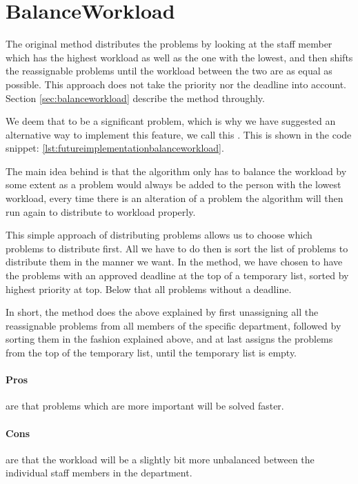 \section{BalanceWorkload}
\label{sec:futureimplementationbalanceworkload}

The original  method distributes the problems by looking at the staff member which has the highest workload as well as the one with the lowest, and then shifts the reassignable problems until the workload between the two are as equal as possible. This approach does not take the priority nor the deadline into account. Section \ref{sec:balanceworkload} describe the  method throughly. 

We deem that to be a significant problem, which is why we have suggested an alternative way to implement this feature, we call this . This is shown in the code snippet: \ref{lst:futureimplementationbalanceworkload}. 

The main idea behind  is that the algorithm only has to balance the workload by some extent as a problem would always be added to the person with the lowest workload, every time there is an alteration of a problem the algorithm will then run again to distribute to workload properly.

This simple approach of distributing problems allows us to choose which problems to distribute first. All we have to do then is sort the list of problems to distribute them in the manner we want. In the  method, we have chosen to have the problems with an approved deadline at the top of a temporary list, sorted by highest priority at top. Below that all problems without a deadline.

In short, the  method does the above explained by first unassigning all the reassignable problems from all members of the specific department, followed by sorting them in the fashion explained above, and at last assigns the problems from the top of the temporary list, until the temporary list is empty.

\paragraph{Pros} are that problems which are more important will be solved faster.
\paragraph{Cons} are that the workload will be a slightly bit more unbalanced between the individual staff members in the department.
